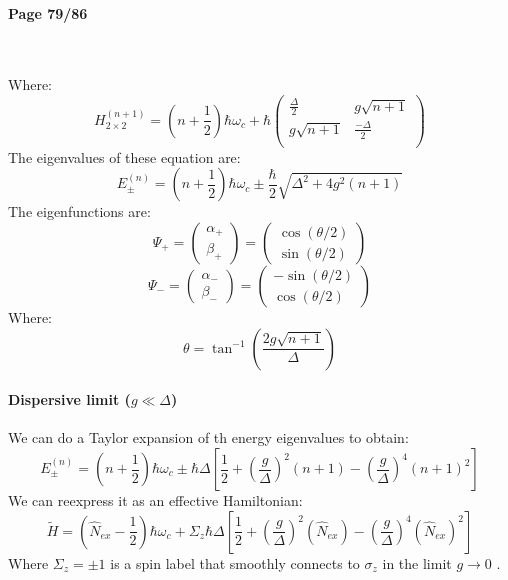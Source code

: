 \documentclass[12pt]{article}
\numberwithin{equation}{subsection}
\newcommand\page[1]{
{
\color{blue}\paragraph{
Page #1
}\mbox{}\\
}
}
\begin{document}
\page{79/86}

Where:
\begin{equation}
     H^{(n+1)}_{2\times 2}
     =\left(n+\frac{1}{2}\right) \hbar \omega_c + 
     \hbar\begin{pmatrix}
    \frac{\Delta}{2} & g\sqrt{n+1}\\
     g\sqrt{n+1}&\frac{-\Delta}{2} \\
    \end{pmatrix}
\end{equation}
The eigenvalues of these equation are:
\begin{equation}
    E^{(n)}_\pm =\left(n+\frac{1}{2}\right) \hbar \omega_c \pm \frac{\hbar}{2} \sqrt{\Delta ^2 + 4g^2 (n+1)}
\end{equation}
The eigenfunctions are:
\begin{equation}
    \Psi_+ = 
    \begin{pmatrix}
    \alpha_+ \\
    \beta_+
    \end{pmatrix}
    =\begin{pmatrix}
   \cos(\theta/2)\\
   \sin(\theta/2) 
    \end{pmatrix}
    
\end{equation}
\begin{equation}
    \Psi_- = 
    \begin{pmatrix}
    \alpha_- \\
    \beta_-
    \end{pmatrix}
    =\begin{pmatrix}
   -\sin(\theta/2)\\ 
   \cos(\theta/2)
    \end{pmatrix}
    
\end{equation}
Where:
\begin{equation}
    \theta = \tan^{-1} \left (   \frac{2g\sqrt{n+1}}{\Delta}  \right )
    \label{eq:theta-cav-atom}
\end{equation}
\paragraph{Dispersive limit ($g\ll \Delta$)} We can do a Taylor expansion of th energy eigenvalues to obtain:
\begin{equation}
    E^{(n)}_\pm =\left(n+\frac{1}{2}\right) \hbar \omega_c \pm \hbar \Delta \left [ \frac{1}{2} + \left(\frac{g}{\Delta}\right)^2 (n+1) - \left(\frac{g}{\Delta}\right)^4 (n+1)^2\right]
\end{equation}
We can reexpress it as an effective Hamiltonian:
\begin{equation}
    \tilde H =\left(\hat N_{ex}-\frac{1}{2}\right) \hbar \omega_c + \Sigma_z \hbar \Delta \left [ \frac{1}{2} + \left(\frac{g}{\Delta}\right)^2 (\hat N_{ex}) - \left(\frac{g}{\Delta}\right)^4 (\hat N_{ex})^2\right]
\end{equation}
Where $\Sigma_z = \pm 1$ is a spin label that smoothly connects to $\sigma_z$ in the limit $g\rightarrow 0 $ .
\end{document}
